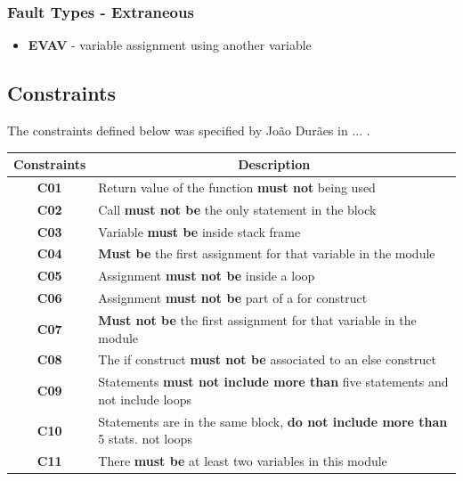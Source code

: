 \subsubsection{Fault Types - Extraneous}
\begin{itemize}
	\item \textbf{EVAV} - variable assignment using another variable
\end{itemize}

\subsection{Constraints}

The constraints defined below was specified by João Durães in ... .

\begin{table}[!ht]
\centering
\begin{tabular}{|c|p{12cm}|}
\hline
\textbf{Constraints}            & \multicolumn{1}{c|}{\textbf{Description}}                                     \\ \hline \hline
\textbf{C01}       \label{C01}  & Return value of the function \textbf{must not} being used                              \\ \hline
\textbf{C02}       \label{C02}  & Call \textbf{must not be} the only statement in the block                              \\ \hline
\textbf{C03}       \label{C03}  & Variable \textbf{must be} inside stack frame                                           \\ \hline
\textbf{C04}       \label{C04}  & \textbf{Must be} the first assignment for that variable in the module                  \\ \hline
\textbf{C05}       \label{C05}  & Assignment \textbf{must not be} inside a loop                                          \\ \hline
\textbf{C06}       \label{C06}  & Assignment \textbf{must not be} part of a for construct                                \\ \hline
\textbf{C07}       \label{C07}  & \textbf{Must not be} the first assignment for that variable in the module              \\ \hline
\textbf{C08}       \label{C08}  & The if construct \textbf{must not be} associated to an else construct                  \\ \hline
\textbf{C09}       \label{C09}  & Statements \textbf{must not include more than} five statements and not include loops   \\ \hline
\textbf{C10}       \label{C010} & Statements are in the same block, \textbf{do not include more than} 5 stats. not loops \\ \hline
\textbf{C11}       \label{C011} & There \textbf{must be} at least two variables in this module                           \\ \hline
\end{tabular}
\end{table}

